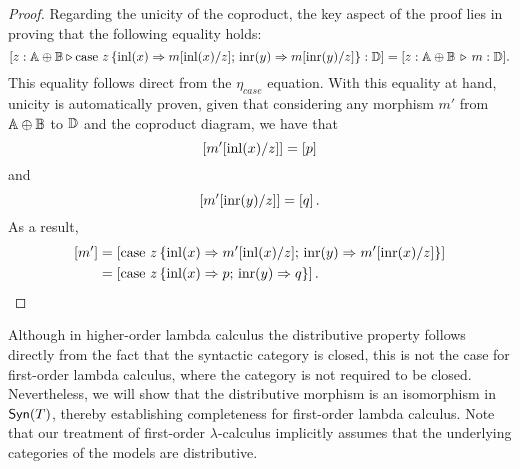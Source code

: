 \begin{proof}
  Regarding the unicity of the coproduct, the key aspect of the proof lies in proving that the following equality holds: 
  $$\left[z:\mathbb{A} \oplus \mathbb{B} \triangleright  \text{case } z \,\{\mathrm{inl}(x) \Rightarrow m[\mathrm{inl}(x)/ z] ; \, \mathrm{inr}(y) \Rightarrow m[\mathrm{inr}(y)/ z]\} : \mathbb{D} \right] = [z:\mathbb{A} \oplus \mathbb{B} \, \triangleright \,m: \mathbb{D}].$$ 
  This equality follows direct from the $\eta_{case}$ equation. With this equality at hand, unicity is automatically proven, given that considering any morphism $m'$ from $\mathbb{A} \oplus \mathbb{B}$ to $\mathbb{D}$ and the coproduct diagram, we have that 
  \[\left[ m'[ \mathrm{inl}(x)/z] \right]  = \left[p \right]   \] 
  and
   \[\left[ m'[\mathrm{inr}(y)/z] \right] = \left[ q\right].\] 
  As a result, 
  \begin{align*}
    \left[ m'\right]& = \left[  \text{case } z \,\{\mathrm{inl}(x) \Rightarrow m'[\mathrm{inl}(x)/ z] ; \, \mathrm{inr}(y) \Rightarrow m'[\mathrm{inr}(x)/ z]\}\right]\\
    & = \left[\text{case } z \,\{\mathrm{inl}(x) \Rightarrow p ; \, \mathrm{inr}(y) \Rightarrow q\}\right]. 
  \end{align*}
  


  \begin{comment}
  Se eu sei que [ t . i1 , t . i2 ] = t


então a unicidade é automaticamente provada

Porque assumindo que temos dois morfismos t e s tal que t . i1 = f = s .i1 e t . i2 = g = s . i2

automaticamente t = s


t = [ t . i1, t . i2 ] = [f ,g] = [ s . i1 , s . i2] = s
  \end{comment}


 


 \end{proof}

 \begin{remark}
  Although in higher-order lambda calculus the distributive property follows directly from the fact that the syntactic category is closed, this is not the case for first-order lambda calculus, where the category is not required to be closed. Nevertheless, we will show that the distributive morphism is an isomorphism in $\mathsf{Syn}(T)$, thereby establishing completeness for first-order lambda calculus. Note that our treatment of first-order $\lambda$-calculus implicitly assumes that the underlying categories of the models are distributive.
 \end{remark}

